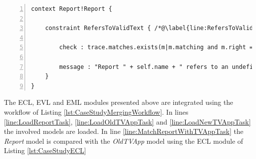 \begin{lstlisting}[basicstyle=\ttfamily\footnotesize, flexiblecolumns=true, numbers=left, nolol=true, caption=EVL module that validates a Report model against a TVApp model, label=lst:ValidateReport, language=EVL, tabsize=2]
context Report!Report {
	
	constraint RefersToValidText { /*@\label{line:RefersToValidText}@*/
		
		check : trace.matches.exists(m|m.matching and m.right = self)
		
		message : "Report " + self.name + " refers to an undefined text"	
	}
}
\end{lstlisting}

The ECL, EVL and EML modules presented above are integrated using the workflow of Listing \ref{lst:CaseStudyMergingWorkflow}. In lines \ref{line:LoadReportTask}, \ref{line:LoadOldTVAppTask} and \ref{line:LoadNewTVAppTask} the involved models are loaded. In line 
\ref{line:MatchReportWithTVAppTask} the \emph{Report} model is compared with the \emph{OldTVApp} model using the ECL module of Listing \ref{lst:CaseStudyECL}

